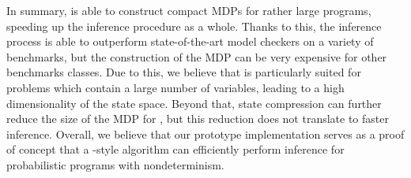 In summary, \NDICE is able to construct compact MDPs for rather large programs, speeding up the inference procedure as a whole.
Thanks to this, the inference process is able to outperform state-of-the-art model checkers on a variety of benchmarks, but the construction of the MDP can be very expensive for other benchmarks classes.
Due to this, we believe that \NDICE is particularly suited for problems which contain a large number of variables, leading to a high dimensionality of the state space.
Beyond that, state compression can further reduce the size of the MDP for \NDICE, but this reduction does not translate to faster inference.
Overall, we believe that our prototype implementation serves as a proof of concept that a \NDICE-style algorithm can efficiently perform inference for probabilistic programs with nondeterminism. 



